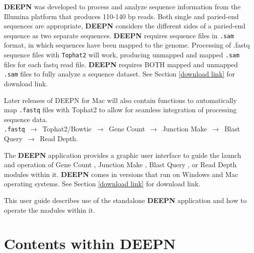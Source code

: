 \documentclass[11pt,fleqn]{book} %
\newcommand{\GeneCount}{{\color{Red} Gene Count }}
\newcommand{\JunctionMake}{{\color{Blue} Junction Make }}
\newcommand{\BlastQuery}{{\color{ForestGreen} Blast Query }}
\newcommand{\ReadDepth}{{\color{Bittersweet} Read Depth }}
\newcommand{\DEEPN}{\textbf{DEEPN }}
\begin{document}
\vspace{15pt}

\DEEPN was developed to process and analyze sequence information from the Illumina platform that produces 110-140 bp reads.  Both single and paried-end sequences are appropriate, \DEEPN considers the different sides of a paried-end sequence as two separate sequences. \DEEPN requires sequence files in \texttt{.sam} format, in which sequences have been mapped to the genome.  Processing of .fastq sequence files with \texttt{Tophat2} will work, producing unmapped and mapped \texttt{.sam} files for each fastq read file. \DEEPN requires BOTH mapped and unmapped \texttt{.sam} files to fully analyze a sequence dataset. See Section \ref{download link} for download link.

\clearpage
\begin{remark}
	Later releases of DEEPN for Mac will also contain functions to automatically map \texttt{.fastq} files with Tophat2 to allow for seamless integration of processing sequence data.\\

	\texttt{.fastq} $\,\to\,$ Tophat2/Bowtie $\,\to\,$ \GeneCount $\,\to\,$ {\color{Blue} Junction Make} $\,\to\,$ {\color{ForestGreen} Blast Query} $\,\to\,$  {\color{Bittersweet} Read Depth}.  
\end{remark}


The \DEEPN application provides a graphic user interface to guide the launch and operation of \GeneCount, \JunctionMake, \BlastQuery, or \ReadDepth modules within it. \DEEPN comes in versions that run on Windows and Mac operating systems. See Section \ref{download link} for download link.

This user guide describes use of the standalone \DEEPN application and how to operate the modules within it.


\section{Contents within DEEPN}
\end{document}
